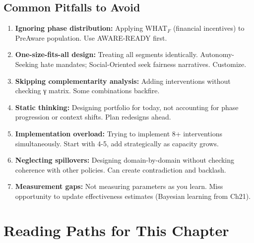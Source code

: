 \subsection{Common Pitfalls to Avoid}

\begin{enumerate}
\item \textbf{Ignoring phase distribution:} Applying WHAT$_F$ (financial incentives) to PreAware population. Use AWARE-READY first.

\item \textbf{One-size-fits-all design:} Treating all segments identically. Autonomy-Seeking hate mandates; Social-Oriented seek fairness narratives. Customize.

\item \textbf{Skipping complementarity analysis:} Adding interventions without checking γ matrix. Some combinations backfire.

\item \textbf{Static thinking:} Designing portfolio for today, not accounting for phase progression or context shifts. Plan redesigns ahead.

\item \textbf{Implementation overload:} Trying to implement 8+ interventions simultaneously. Start with 4-5, add strategically as capacity grows.

\item \textbf{Neglecting spillovers:} Designing domain-by-domain without checking coherence with other policies. Can create contradiction and backlash.

\item \textbf{Measurement gaps:} Not measuring parameters as you learn. Miss opportunity to update effectiveness estimates (Bayesian learning from Ch21).

\end{enumerate}


\section*{Reading Paths for This Chapter}

